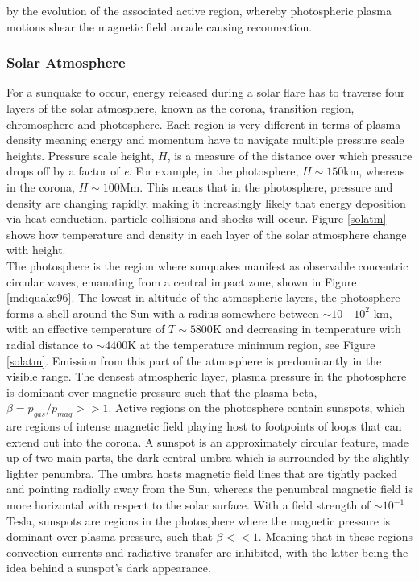 by the evolution of the associated active region, whereby photospheric plasma motions shear the magnetic field arcade causing reconnection. 


\subsubsection{Solar Atmosphere}
For a sunquake to occur, energy released during a solar flare has to traverse four layers of the solar atmosphere, known as the corona, transition region, chromosphere and photosphere. Each region is very different in terms of plasma density meaning energy and momentum have to navigate multiple pressure scale heights. Pressure scale height, $H$, is a measure of the distance over which pressure drops off by a factor of \emph{e}. For example, in the photosphere, $H\sim150$km, whereas in the corona, $H\sim100$Mm. This means that in the photosphere, pressure and density are changing rapidly, making it increasingly likely that energy deposition via heat conduction, particle collisions and shocks will occur. Figure \ref{solatm} shows how temperature and density in each layer of the solar atmosphere change with height. \\

The photosphere is the region where sunquakes manifest as observable concentric circular waves, emanating from a central impact zone, shown in Figure \ref{mdiquake96}. The lowest in altitude of the atmospheric layers, the photosphere forms a shell around the Sun with a radius somewhere between $\sim10$ - $10^{2}$ km, with an effective temperature of $T\sim5800$K and decreasing in temperature with radial distance to $\sim4400$K at the temperature minimum region, see Figure \ref{solatm}. Emission from this part of the atmosphere is predominantly in the visible range. The densest atmospheric layer, plasma pressure in the photosphere is dominant over magnetic pressure such that the plasma-beta, $\beta = p_{gas}/p_{mag} >> 1$. Active regions on the photosphere contain sunspots, which are regions of intense magnetic field playing host to footpoints of loops that can extend out into the corona. A sunspot is an approximately circular feature, made up of two main parts, the dark central umbra which is surrounded by the slightly lighter penumbra. The umbra hosts magnetic field lines that are tightly packed and pointing radially away from the Sun, whereas the penumbral magnetic field is more horizontal with respect to the solar surface. With a field strength of $\sim 10^{-1}$ Tesla, sunspots are regions in the photosphere where the magnetic pressure is dominant over plasma pressure, such that $\beta << 1$. Meaning that in these regions convection currents and radiative transfer are inhibited, with the latter being the idea behind a sunspot's dark appearance. \\



